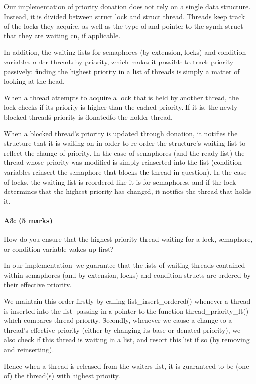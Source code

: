 Our implementation of priority donation does not rely on a single data structure. Instead, it is divided between struct lock and struct thread. Threads keep track of the locks they acquire, as well as the type of and pointer to the synch struct that they are waiting on, if applicable.

In addition, the waiting lists for semaphores (by extension, locks) and condition variables order threads by priority, which makes it possible to track priority passively: finding the highest priority in a list of threads is simply a matter of looking at the head.

When a thread attempts to acquire a lock that is held by another thread, the lock checks if its priority is higher than the cached priority. If it is, the newly blocked thread\'s priority is \"donated\" to the holder thread.

When a blocked thread's priority is updated through donation, it notifies the structure that it is waiting on in order to re-order the structure's waiting list to reflect the change of priority.
In the case of semaphores (and the ready list) the thread whose priority was modified is simply reinserted into the list (condition variables reinsert the semaphore that blocks the thread in question).
In the case of locks, the waiting list is reordered like it is for semaphores, and if the lock determines that the highest priority has changed, it notifies the thread that holds it.

\paragraph{A3: (5 marks)}
How do you ensure that the highest priority thread waiting for a lock, semaphore, or condition variable wakes up first?

In our implementation, we guarantee that the lists of waiting threads contained within semaphores (and by extension, locks) and condition structs are ordered by their effective priority.

We maintain this order firstly by calling list\_insert\_ordered() whenever a thread is inserted into the list, passing in a pointer to the function thread\_priority\_lt() which compares thread priority. Secondly, whenever we cause a change to a thread's effective priority (either by changing its base or donated priority), we also check if this thread is waiting in a list, and resort this list if so (by removing and reinserting).

Hence when a thread is released from the waiters list, it is guaranteed to be (one of) the thread(s) with highest priority.

